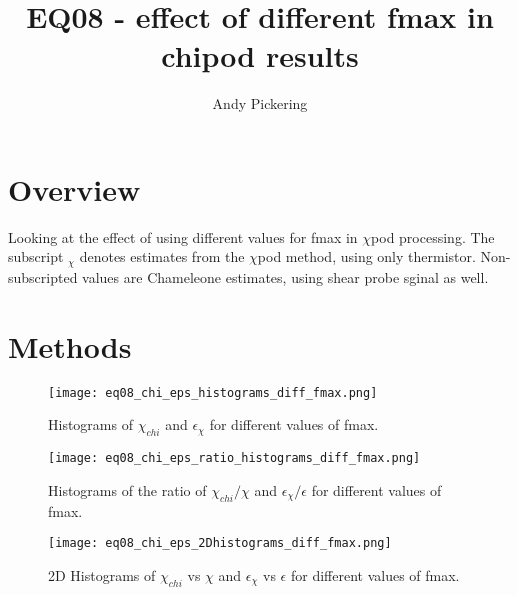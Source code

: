 \documentclass[11pt]{article}
\title{EQ08 - effect of different fmax in chipod results}
\author{Andy Pickering}
\begin{document}
\maketitle

\tableofcontents
\newpage

\section{Overview}


Looking at the effect of using different values for fmax in $\chi$pod processing. The subscript $_{\chi}$ denotes estimates from the $\chi$pod method, using only thermistor. Non-subscripted values are Chameleone estimates, using shear probe sginal as well.





\section{Methods}

\begin{itemize}


\end{itemize}


\begin{figure}[htbp]
\texttt{[image: eq08\_chi\_eps\_histograms\_diff\_fmax.png]}
\caption{Histograms of $\chi_{chi}$ and $\epsilon_{\chi}$ for different values of fmax.}
\label{}
\end{figure}

\begin{figure}[htbp]
\texttt{[image: eq08\_chi\_eps\_ratio\_histograms\_diff\_fmax.png]}
\caption{Histograms of the ratio of  $\chi_{chi}/\chi$ and $\epsilon_{\chi}/\epsilon$ for different values of fmax.}
\label{}
\end{figure}



\begin{figure}[htbp]
\texttt{[image: eq08\_chi\_eps\_2Dhistograms\_diff\_fmax.png]}
\caption{2D Histograms of $\chi_{chi}$ vs $\chi$ and $\epsilon_{\chi}$ vs $\epsilon$ for different values of fmax.}
\label{}
\end{figure}
\end{document}
